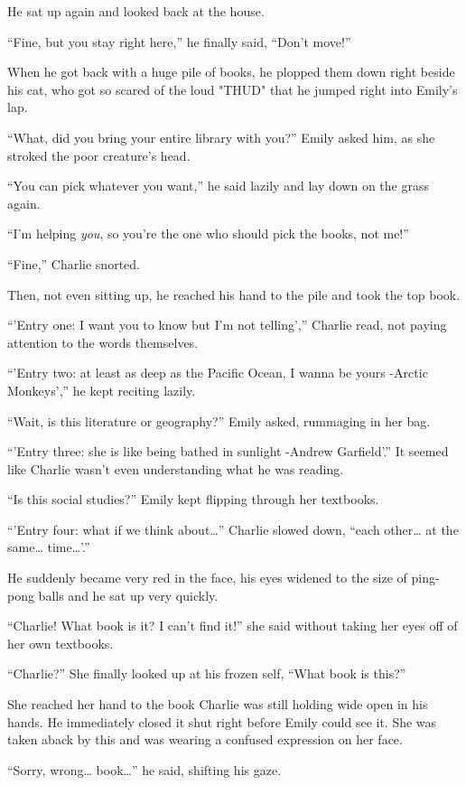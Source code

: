 He sat up again and looked back at the house.

“Fine, but you stay right here,” he finally said, “Don't move!”

\bigskip

When he got back with a huge pile of books, he plopped them down right beside his cat, who got so scared of the loud "THUD" that he jumped right into Emily's lap.

“What, did you bring your entire library with you?” Emily asked him, as she stroked the poor creature's head.

“You can pick whatever you want,” he said lazily and lay down on the grass again.

“I'm helping \textit{you}, so you're the one who should pick the books, not me!”

“Fine,” Charlie snorted.

Then, not even sitting up, he reached his hand to the pile and took the top book.

“'Entry one: I want you to know but I'm not telling',” Charlie read, not paying attention to the words themselves.

“'Entry two: at least as deep as the Pacific Ocean, I wanna be yours -Arctic Monkeys',” he kept reciting lazily.

“Wait, is this literature or geography?” Emily asked, rummaging in her bag.

“'Entry three: she is like being bathed in sunlight -Andrew Garfield'.” It seemed like Charlie wasn't even understanding what he was reading.

“Is this social studies?” Emily kept flipping through her textbooks.

“'Entry four: what if we think about…” Charlie slowed down, “each other… at the same… time…'.”

He suddenly became very red in the face, his eyes widened to the size of ping-pong balls and he sat up very quickly.

“Charlie! What book is it? I can't find it!” she said without taking her eyes off of her own textbooks.

“Charlie?” She finally looked up at his frozen self, “What book is this?”

She reached her hand to the book Charlie was still holding wide open in his hands. He immediately closed it shut right before Emily could see it. She was taken aback by this and was wearing a confused expression on her face.

“Sorry, wrong… book…” he said, shifting his gaze.

